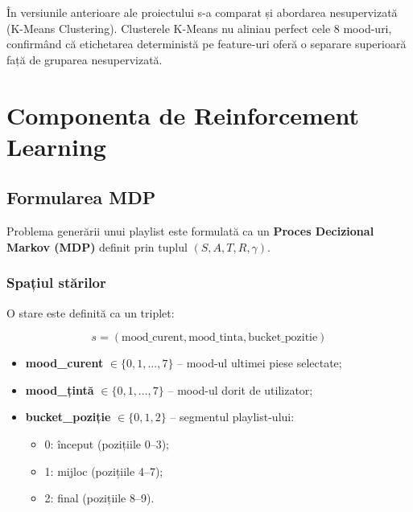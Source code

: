 \documentclass[12pt,a4paper]{article}
\begin{document}
În versiunile anterioare ale proiectului s-a comparat și abordarea nesupervizată (K-Means Clustering). Clusterele K-Means nu aliniau perfect cele 8 mood-uri, confirmând că etichetarea deterministă pe feature-uri oferă o separare superioară față de gruparea nesupervizată.

\FloatBarrier

\section{Componenta de Reinforcement Learning}

\subsection{Formularea MDP}
\label{sec:mdp}

Problema generării unui playlist este formulată ca un \textbf{Proces Decizional Markov (MDP)} definit prin tuplul $(S, A, T, R, \gamma)$.

\subsubsection{Spațiul stărilor}

O stare este definită ca un triplet:

\begin{equation}
s = (\text{mood\_curent}, \text{mood\_tinta}, \text{bucket\_pozitie})
\end{equation}

\begin{itemize}
    \item \textbf{mood\_curent} $\in \{0, 1, ..., 7\}$ -- mood-ul ultimei piese selectate;
    \item \textbf{mood\_țintă} $\in \{0, 1, ..., 7\}$ -- mood-ul dorit de utilizator;
    \item \textbf{bucket\_poziție} $\in \{0, 1, 2\}$ -- segmentul playlist-ului:
    \begin{itemize}
        \item 0: început (pozițiile 0--3);
        \item 1: mijloc (pozițiile 4--7);
        \item 2: final (pozițiile 8--9).
    \end{itemize}
\end{itemize}
\end{document}
